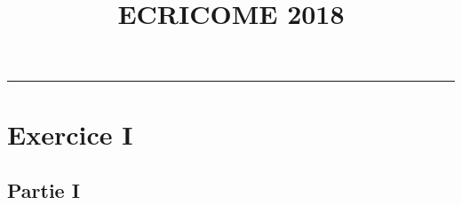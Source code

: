 \documentclass[11pt]{article}%
\title{\bf \vspace{-1.6cm} ECRICOME 2018} %
\author{} %
\date{} %
\begin{document}
\maketitle %
\vspace{-1.2cm}\hrule %
\thispagestyle{fancy}

\vspace*{-.2cm}


\section*{Exercice I}

\subsection*{Partie I}
\end{document}

